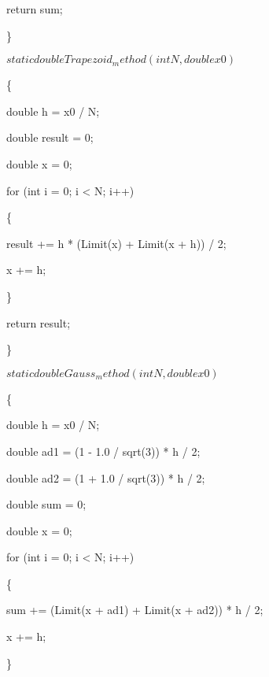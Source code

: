 \documentclass[12pt,a4paper]{report}
\begin{document}
		\hspace{1cm}return sum;
	
	\}
	
	$static double Trapezoid_method(int N, double x0)$
	
	\{
	
		\hspace{1cm}double h = x0 / N;
	
		\hspace{1cm}double result = 0;
	
		\hspace{1cm}double x = 0;
	
		\hspace{1cm}for (int i = 0; i < N; i++)
	
		\hspace{1cm}\{
	
			\hspace{2cm}result += h * (Limit(x) + Limit(x + h)) / 2;
	
			\hspace{2cm}x += h;
	
		\hspace{1cm}\}
	
		\hspace{1cm}return result;
	
	\}
	
	$static double Gauss_method(int N, double x0)$
	
	\{
	
		\hspace{1cm}double h = x0 / N;
	
		\hspace{1cm}double ad1 = (1 - 1.0 / sqrt(3)) * h / 2;
	
		\hspace{1cm}double ad2 = (1 + 1.0 / sqrt(3)) * h / 2;
	
		\hspace{1cm}double sum = 0;
	
		\hspace{1cm}double x = 0;
	
		\hspace{1cm}for (int i = 0; i < N; i++)
	
		\hspace{1cm}\{
	
			\hspace{2cm}sum += (Limit(x + ad1) + Limit(x + ad2)) * h / 2;
	
			\hspace{2cm}x += h;
	
		\hspace{1cm}\}
	
\end{document}
